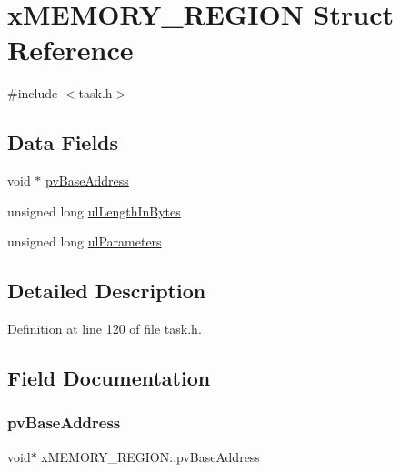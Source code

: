 \hypertarget{structxMEMORY__REGION}{}\section{x\+M\+E\+M\+O\+R\+Y\+\_\+\+R\+E\+G\+I\+ON Struct Reference}
\label{structxMEMORY__REGION}


{\ttfamily \#include $<$task.\+h$>$}

\subsection*{Data Fields}
\begin{DoxyCompactItemize}
\item 
void $\ast$ \hyperlink{structxMEMORY__REGION_a228036bbfdbc38f170e45deadb166172}{pv\+Base\+Address}
\item 
unsigned long \hyperlink{structxMEMORY__REGION_ac296475c5bdf95765db1786789e3aa4d}{ul\+Length\+In\+Bytes}
\item 
unsigned long \hyperlink{structxMEMORY__REGION_a8750b0cad9c8b2c602ca9f0f2342b3aa}{ul\+Parameters}
\end{DoxyCompactItemize}


\subsection{Detailed Description}


Definition at line 120 of file task.\+h.



\subsection{Field Documentation}
\mbox{\label{structxMEMORY__REGION_a228036bbfdbc38f170e45deadb166172}} 
\subsubsection{\texorpdfstring{pv\+Base\+Address}{pvBaseAddress}}
{\footnotesize\ttfamily void$\ast$ x\+M\+E\+M\+O\+R\+Y\+\_\+\+R\+E\+G\+I\+O\+N\+::pv\+Base\+Address}




